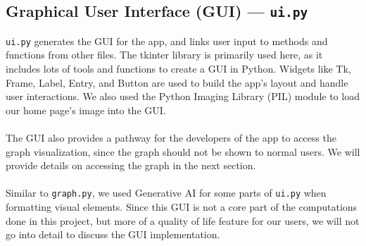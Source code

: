 \documentclass[fontsize=11pt]{article}
\begin{document}
\subsection*{Graphical User Interface (GUI) --- \texttt{ui.py}}
\texttt{ui.py} generates the GUI for the app, and links user input to methods and functions from other files.
The tkinter library is primarily used here, as it includes lots of tools and functions to create a GUI in Python.
Widgets like Tk, Frame, Label, Entry, and Button are used to build the app’s layout and handle user interactions.
We also used the Python Imaging Library (PIL) module to load our home page’s image into the GUI.
\\
\\
The GUI also provides a pathway for the developers of the app to access the graph visualization, since the graph should not be shown to normal users.
We will provide details on accessing the graph in the next section.
\\
\\
Similar to \texttt{graph.py}, we used Generative AI for some parts of \texttt{ui.py} when formatting visual elements.
Since this GUI is not a core part of the computations done in this project, but more of a quality of life feature for our users, we will not go into detail to discuss the GUI implementation.
\end{document}
